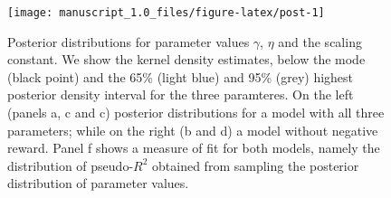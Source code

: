 \documentclass[]{rsos}%
\begin{document}
\begin{figure}

{\centering \texttt{[image: manuscript\_1.0\_files/figure-latex/post-1]} 

}

\caption{Posterior distributions for parameter values $\gamma$, $\eta$ and the scaling constant. We show the kernel density estimates, below the mode (black point) and the 65\% (light blue) and 95\% (grey)  highest posterior density interval for the three paramteres. On the left (panels a, c and c) posterior distributions for a model with   all three parameters; while on the right (b and d) a model without negative reward. Panel f shows a measure of fit for both models, namely the distribution of pseudo-$R^2$ obtained from sampling the posterior distribution of parameter values.}\label{fig:post}
\end{figure}
\end{document}
